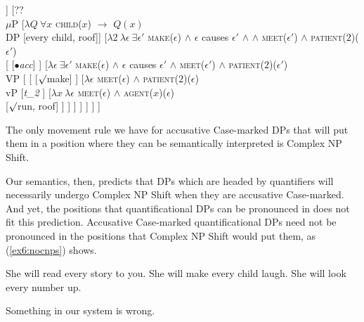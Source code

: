 \begin{fullwidth}
\begin{exe}
\begin{xlist}
		\ex 
		\begin{forest}
		[\ibar{v}
			[\obar{v} [agent] ]
			[??\\ $\mu$P
				[$\lambda Q\ \forall x$ \textsc{child}($x$) $\rightarrow$ $Q(x)$\\DP [every child, roof]]
				[$\lambda 2\ \lambda \epsilon\ \exists \epsilon'$ \textsc{make}($\epsilon$) $\wedge$ $\epsilon$ causes $\epsilon'$ $\wedge$ $\wedge$ \textsc{meet}($\epsilon'$) $\wedge$ \textsc{patient}($2$)($\epsilon'$)\\\ibar{$\mu$}
					[\obar{$\mu$} [$\bullet$\emph{acc}] ]
					[$\lambda \epsilon\ \exists \epsilon'$ \textsc{make}($\epsilon$) $\wedge$ $\epsilon$ causes $\epsilon'$ $\wedge$ \textsc{meet}($\epsilon'$) $\wedge$ \textsc{patient}($2$)($\epsilon'$)\\VP [
						[ [$\surd$make] ]
						[$\lambda \epsilon$ \textsc{meet}($\epsilon$) $\wedge$ \textsc{patient}($2$)($\epsilon$)\\vP
							[\emph{t_2} ]
							[$\lambda x\ \lambda \epsilon$ \textsc{meet}($\epsilon$) $\wedge$ \textsc{agent}($x$)($\epsilon$) \\ [$\surd$run, roof] ]
						 ]
					] ]
				 ]
			]
		]
		\end{forest}
%
%
%
	\end{xlist}
\end{exe}
\end{fullwidth}
\medskip
The only movement rule we have for accusative Case-marked DPs that will put them in a position where they can be semantically interpreted is Complex NP Shift.

Our semantics, then, predicts that DPs which are headed by quantifiers will necessarily undergo Complex NP Shift when they are accusative Case-marked. And yet, the positions that quantificational DPs can be pronounced in does not fit this prediction. Accusative Case-marked quantificational DPs need not be pronounced in the positions that Complex NP Shift would put them, as (\ref{ex6:nocnps}) shows.
\begin{exe}
\raggedright
	\ex \label{ex6:nocnps}
	\begin{xlist}
		\ex She will read every story to you.
		\ex She will make every child laugh.
		\ex She will look every number up.
	\end{xlist}
\end{exe}
Something in our system is wrong.

